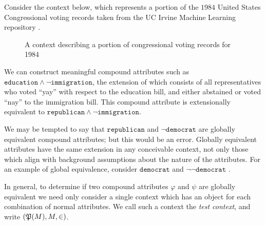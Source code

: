 \begin{example}
  Consider the context below, which represents a portion of the $1984$ United States Congressional voting records taken from the UC Irvine
  Machine Learning repository \cite{congressional_voting_records_105}.

  \begin{figure}[H]
    \centering
    \begin{cxt}
      \label{cxt:voting}    
          
        
    \end{cxt}
    \caption{A context describing a portion of congressional voting records for 1984}
    \label{figure:voting-records}
  \end{figure}

  We can construct meaningful compound attributes such as $\texttt{education}\land \neg \texttt{immigration}$, the extension of which
  consists of all representatives who voted ``yay'' with respect to the education bill, and either abstained or voted ``nay'' to the immigration
  bill. This compound attribute is extensionally equivalent to $\texttt{republican}\land \neg \texttt{immigration}$.

  We may be tempted to say that $\texttt{republican}$ and $\neg \texttt{democrat}$ are globally equivalent compound attributes; but this would
  be an error. Globally equivalent attributes have the same extension in any conceivable context, not only those which align with background
  assumptions about the nature of the attributes. For an example of global equivalence, consider $\texttt{democrat}$ and $\neg \neg \texttt{democrat
  }$.
\end{example}

In general, to determine if two compound attributes $\varphi$ and $\psi$ are globally equivalent we need only consider a single context
which has an object for each combination of normal attributes. We call such a context the \textit{test context}, and write $(\mathfrak{P}({M}),M,\in)$.

